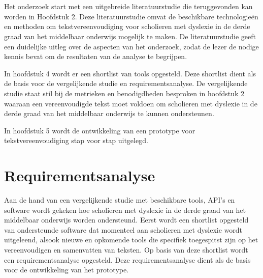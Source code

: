 
\chapter{}%
\label{ch:methodologie}


Het onderzoek start met een uitgebreide literatuurstudie die teruggevonden kan worden in Hoofdstuk 2. Deze literatuurstudie omvat de beschikbare technologieën en methoden om tekstvereenvoudiging voor scholieren met dyslexie in de derde graad van het middelbaar onderwijs mogelijk te maken. De literatuurstudie geeft een duidelijke uitleg over de aspecten van het onderzoek, zodat de lezer de nodige kennis bevat om de resultaten van de analyse te begrijpen.

In hoofdstuk 4 wordt er een shortlist van tools opgesteld. Deze shortlist dient als de basis voor de vergelijkende studie en requirementsanalyse. De vergelijkende studie staat stil bij de metrieken en benodigdheden besproken in hoofdstuk 2 waaraan een vereenvoudigde tekst moet voldoen om scholieren met dyslexie in de derde graad van het middelbaar onderwijs te kunnen ondersteunen.

In hoofdstuk 5 wordt de ontwikkeling van een prototype voor tekstvereenvoudiging stap voor stap uitgelegd. 

\chapter{Requirementsanalyse}

Aan de hand van een vergelijkende studie met beschikbare tools, API's en software wordt gekeken hoe scholieren met dyslexie in de derde graad van het middelbaar onderwijs worden ondersteund. Eerst wordt een shortlist opgesteld van ondersteunde software dat momenteel aan scholieren met dyslexie wordt uitgeleend, alsook nieuwe en opkomende tools die specifiek toegespitst zijn op het vereenvoudigen en samenvatten van teksten. Op basis van deze shortlist wordt een requirementsanalyse opgesteld. Deze requirementsanalyse dient als de basis voor de ontwikkeling van het prototype.

